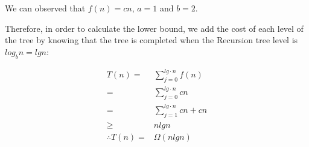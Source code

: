\documentclass[11pt]{article}
\begin{document}
\begin{flushleft}
    We can observed that $f(n) = cn$, $a = 1$ and $b = 2$.
    \newline
    
    Therefore, in order to calculate the lower bound, we add the cost of each level of the tree by knowing that the tree is completed when the Recursion tree level is $log_b n = lg n$:
\end{flushleft}
\begin{equation*}
    \begin {split}
        T(n) =& \sum_{j = 0}^{lg \cdot n} f(n) \\
             =& \sum_{j = 0}^{lg \cdot n} cn \\
             =& \sum_{j = 1}^{lg \cdot n} cn + cn \\
             \geq & n lg n \\
        \therefore{} T(n) = &\Omega(n lg n)
    \end {split}
    \end{equation*}
\end{document}
